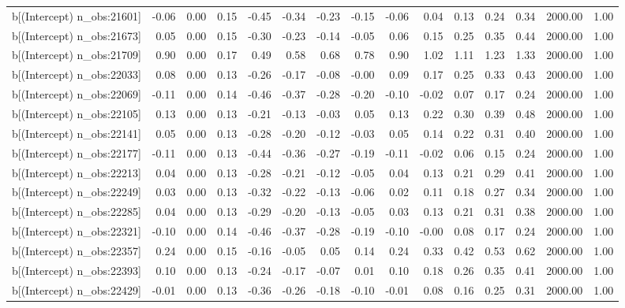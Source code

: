 \begin{table}[ht]
\begin{tabular}{rrrrrrrrrrrrrrr}
  b[(Intercept) n\_obs:21601] & -0.06 & 0.00 & 0.15 & -0.45 & -0.34 & -0.23 & -0.15 & -0.06 & 0.04 & 0.13 & 0.24 & 0.34 & 2000.00 & 1.00 \\ 
  b[(Intercept) n\_obs:21673] & 0.05 & 0.00 & 0.15 & -0.30 & -0.23 & -0.14 & -0.05 & 0.06 & 0.15 & 0.25 & 0.35 & 0.44 & 2000.00 & 1.00 \\ 
  b[(Intercept) n\_obs:21709] & 0.90 & 0.00 & 0.17 & 0.49 & 0.58 & 0.68 & 0.78 & 0.90 & 1.02 & 1.11 & 1.23 & 1.33 & 2000.00 & 1.00 \\ 
  b[(Intercept) n\_obs:22033] & 0.08 & 0.00 & 0.13 & -0.26 & -0.17 & -0.08 & -0.00 & 0.09 & 0.17 & 0.25 & 0.33 & 0.43 & 2000.00 & 1.00 \\ 
  b[(Intercept) n\_obs:22069] & -0.11 & 0.00 & 0.14 & -0.46 & -0.37 & -0.28 & -0.20 & -0.10 & -0.02 & 0.07 & 0.17 & 0.24 & 2000.00 & 1.00 \\ 
  b[(Intercept) n\_obs:22105] & 0.13 & 0.00 & 0.13 & -0.21 & -0.13 & -0.03 & 0.05 & 0.13 & 0.22 & 0.30 & 0.39 & 0.48 & 2000.00 & 1.00 \\ 
  b[(Intercept) n\_obs:22141] & 0.05 & 0.00 & 0.13 & -0.28 & -0.20 & -0.12 & -0.03 & 0.05 & 0.14 & 0.22 & 0.31 & 0.40 & 2000.00 & 1.00 \\ 
  b[(Intercept) n\_obs:22177] & -0.11 & 0.00 & 0.13 & -0.44 & -0.36 & -0.27 & -0.19 & -0.11 & -0.02 & 0.06 & 0.15 & 0.24 & 2000.00 & 1.00 \\ 
  b[(Intercept) n\_obs:22213] & 0.04 & 0.00 & 0.13 & -0.28 & -0.21 & -0.12 & -0.05 & 0.04 & 0.13 & 0.21 & 0.29 & 0.41 & 2000.00 & 1.00 \\ 
  b[(Intercept) n\_obs:22249] & 0.03 & 0.00 & 0.13 & -0.32 & -0.22 & -0.13 & -0.06 & 0.02 & 0.11 & 0.18 & 0.27 & 0.34 & 2000.00 & 1.00 \\ 
  b[(Intercept) n\_obs:22285] & 0.04 & 0.00 & 0.13 & -0.29 & -0.20 & -0.13 & -0.05 & 0.03 & 0.13 & 0.21 & 0.31 & 0.38 & 2000.00 & 1.00 \\ 
  b[(Intercept) n\_obs:22321] & -0.10 & 0.00 & 0.14 & -0.46 & -0.37 & -0.28 & -0.19 & -0.10 & -0.00 & 0.08 & 0.17 & 0.24 & 2000.00 & 1.00 \\ 
  b[(Intercept) n\_obs:22357] & 0.24 & 0.00 & 0.15 & -0.16 & -0.05 & 0.05 & 0.14 & 0.24 & 0.33 & 0.42 & 0.53 & 0.62 & 2000.00 & 1.00 \\ 
  b[(Intercept) n\_obs:22393] & 0.10 & 0.00 & 0.13 & -0.24 & -0.17 & -0.07 & 0.01 & 0.10 & 0.18 & 0.26 & 0.35 & 0.41 & 2000.00 & 1.00 \\ 
  b[(Intercept) n\_obs:22429] & -0.01 & 0.00 & 0.13 & -0.36 & -0.26 & -0.18 & -0.10 & -0.01 & 0.08 & 0.16 & 0.25 & 0.31 & 2000.00 & 1.00 \\ 

\end{tabular}
\end{table}
